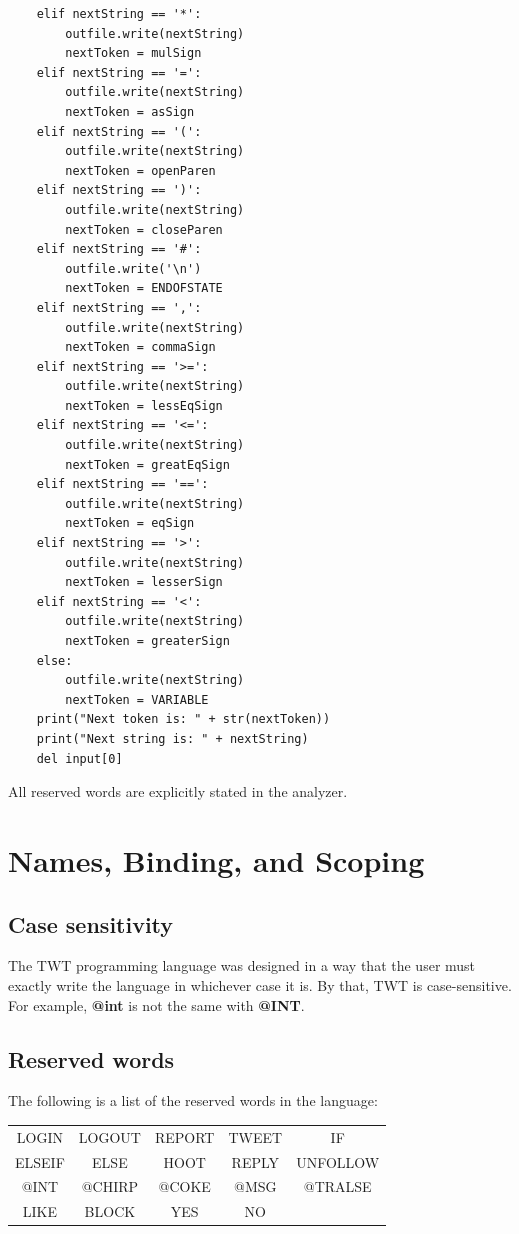\documentclass[11pt,a4paper]{report}
\begin{document}
\begin{lstlisting}
    elif nextString == '*':
        outfile.write(nextString)
        nextToken = mulSign
    elif nextString == '=':
        outfile.write(nextString)
        nextToken = asSign
    elif nextString == '(':
        outfile.write(nextString)
        nextToken = openParen
    elif nextString == ')':
        outfile.write(nextString)
        nextToken = closeParen
    elif nextString == '#':
        outfile.write('\n')
        nextToken = ENDOFSTATE
    elif nextString == ',':
        outfile.write(nextString)
        nextToken = commaSign
    elif nextString == '>=':
        outfile.write(nextString)
        nextToken = lessEqSign
    elif nextString == '<=':
        outfile.write(nextString)
        nextToken = greatEqSign
    elif nextString == '==':
        outfile.write(nextString)
        nextToken = eqSign
    elif nextString == '>':
        outfile.write(nextString)
        nextToken = lesserSign
    elif nextString == '<':
        outfile.write(nextString)
        nextToken = greaterSign
    else:
        outfile.write(nextString)
        nextToken = VARIABLE
    print("Next token is: " + str(nextToken))
    print("Next string is: " + nextString)
    del input[0]

\end{lstlisting} 

All reserved words are explicitly stated in the analyzer.

\chapter{Names, Binding, and Scoping}

\section{Case sensitivity}

The TWT programming language was designed in a way that the user must
exactly write the language in whichever case it is. By that, TWT is
case-sensitive. For example, \textbf{@int} is not the same with \textbf{@INT}.

\section{Reserved words}

The following is a list of the reserved words in the language:

\begin{center}
\begin{tabular}{ c c c c c }
 LOGIN & LOGOUT & REPORT & TWEET & IF \\ 
 ELSEIF & ELSE & HOOT & REPLY & UNFOLLOW \\  
 @INT & @CHIRP & @COKE & @MSG & @TRALSE \\
 LIKE & BLOCK & YES & NO
\end{tabular}
\end{center}
\end{document}
